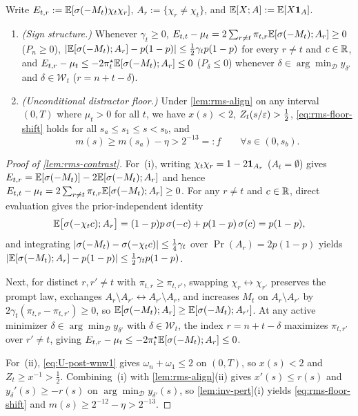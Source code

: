 \begin{lemma}
\label{lem:rms-contrast}
Write $E_{t,r} := \mathbb E[\sigma(-M_t)\chi_t\chi_r]$, $A_r := \{\chi_r \ne \chi_t\}$, and $\mathbb E[X; A] := \mathbb E[X\mathbf 1_A]$.
\begin{enumerate}[label=(\roman*),leftmargin=*,itemsep=1pt,topsep=2pt]
\item \emph{(Sign structure.)} Whenever $\gamma_t \ge 0$, $E_{t,t} - \mu_t = 2\sum_{r\ne t}\pi_{t,r}\mathbb E[\sigma(-M_t); A_r] \ge 0$ ($P_n \ge 0$), $\lvert\mathbb E[\sigma(-M_t); A_r] - p(1-p)\rvert \le \frac{1}{2}\gamma_t p(1-p)$ for every $r \ne t$ and $c \in \mathbb R$, and $E_{t,r} - \mu_t \le -2\pi_t^\star\mathbb E[\sigma(-M_t); A_r] \le 0$ ($P_\delta \le 0$) whenever $\delta \in \arg\min_{\mathcal D} y_{\delta'}$ and $\delta \in \mathcal W_t$ ($r = n + t - \delta$).
\item \emph{(Unconditional distractor floor.)} Under \cref{lem:rms-align} on any interval $(0, T)$ where $\mu_t > 0$ for all $t$, we have $x(s) < 2$, $Z_t(s/\varepsilon) > \frac{1}{2}$, \cref{eq:rms-floor-shift} holds for all $s_a \le s_1 \le s < s_b$, and
\[
  \boxed{\;m(s) \ge m(s_a) - \eta > 2^{-13} =: f \qquad \forall s \in (0, s_b).\;}
\]
\end{enumerate}
\end{lemma}
\begin{proof}[Proof of \cref{lem:rms-contrast}]
For~(i), writing $\chi_t\chi_r = 1 - 2\mathbf 1_{A_r}$ ($A_t = \emptyset$) gives $E_{t,r} = \mathbb E[\sigma(-M_t)] - 2\mathbb E[\sigma(-M_t); A_r]$ and hence $E_{t,t} - \mu_t = 2\sum_{r\ne t}\pi_{t,r}\mathbb E[\sigma(-M_t); A_r] \ge 0$. For any $r \ne t$ and $c \in \mathbb R$, direct evaluation gives the prior-independent identity
\[
  \mathbb E\bigl[\sigma(-\chi_tc); A_r\bigr] = (1-p)p\,\sigma(-c) + p(1-p)\,\sigma(c) = p(1-p),
\]
and integrating $|\sigma(-M_t) - \sigma(-\chi_tc)| \le \frac{1}{4}\gamma_t$ over $\Pr(A_r) = 2p(1-p)$ yields $|\mathbb E[\sigma(-M_t); A_r] - p(1-p)| \le \frac{1}{2}\gamma_t p(1-p)$.

Next, for distinct $r, r' \ne t$ with $\pi_{t,r} \ge \pi_{t,r'}$, swapping $\chi_r \leftrightarrow \chi_{r'}$ preserves the prompt law, exchanges $A_r\setminus A_{r'} \leftrightarrow A_{r'}\setminus A_r$, and increases $M_t$ on $A_r\setminus A_{r'}$ by $2\gamma_t(\pi_{t,r} - \pi_{t,r'}) \ge 0$, so $\mathbb E[\sigma(-M_t); A_r] \ge \mathbb E[\sigma(-M_t); A_{r'}]$. At any active minimizer $\delta \in \arg\min_{\mathcal D} y_{\delta'}$ with $\delta \in \mathcal W_t$, the index $r = n + t - \delta$ maximizes $\pi_{t,r'}$ over $r' \ne t$, giving $E_{t,r} - \mu_t \le -2\pi_t^\star\mathbb E[\sigma(-M_t); A_r] \le 0$.

For~(ii), \cref{eq:U-post-wnw1} gives $\omega_n + \omega_1 \le 2$ on $(0, T)$, so $x(s) < 2$ and $Z_t \ge x^{-1} > \frac{1}{2}$. Combining~(i) with \cref{lem:rms-align}(ii) gives $x'(s) \le r(s)$ and $y_\delta'(s) \ge -r(s)$ on $\arg\min_{\mathcal D} y_{\delta'}(s)$, so \cref{lem:inv-pert}(i) yields \cref{eq:rms-floor-shift} and $m(s) \ge 2^{-12} - \eta > 2^{-13}$.
\end{proof}

